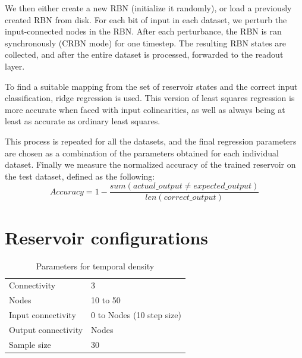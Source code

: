 We then either create a new RBN (initialize it randomly),
or load a previously created RBN from disk.
For each bit of input in each dataset,
we perturb the input-connected nodes in the RBN.
After each perturbance, the RBN is ran synchronously (CRBN mode) for one timestep.
The resulting RBN states are collected,
and after the entire dataset is processed,
forwarded to the readout layer.

To find a suitable mapping from the set of reservoir states and the correct input classification,
ridge regression \cite{hoerl1970ridge} is used.
This version of least squares regression is more accurate when faced with input colinearities,
as well as always being at least as accurate as ordinary least squares.

This process is repeated for all the datasets,
and the final regression parameters are chosen as a combination of the parameters obtained for each individual dataset.
Finally we measure the normalized accuracy of the trained reservoir on the test dataset,
defined as the following:
\begin{equation}
Accuracy = 1 - \dfrac{sum(actual\_output \neq expected\_output)}{len(correct\_output)}
\label{formula:accuracy}
\end{equation}

\section{Reservoir configurations}

\begin{table}[ht]
    \centering
    \caption{Parameters for temporal density}
    \label{tab:parameters-temporal-density}
    \begin{tabular}{ll}
        Connectivity        & 3                         \\
        Nodes               & 10 to 50                  \\
        Input connectivity  & 0 to Nodes (10 step size) \\
        Output connectivity & Nodes                     \\
        Sample size         & 30
    \end{tabular}
\end{table}
